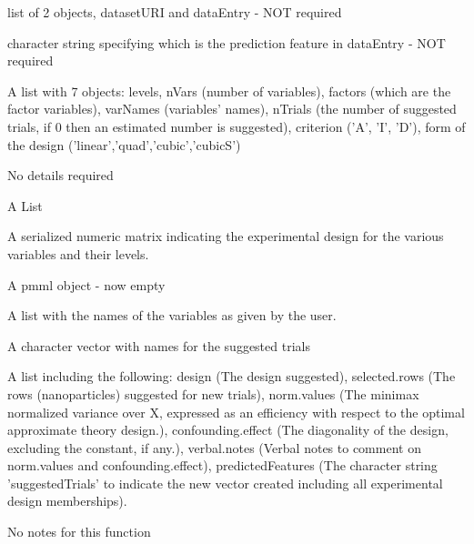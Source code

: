 \documentclass[letterpaper]{book}
\begin{document}
%
\begin{Arguments}
\begin{ldescription}
\item[\code{dataset}] list of 2 objects, datasetURI and dataEntry - NOT required 

\item[\code{predictionFeature}]  character string specifying which is the prediction feature in dataEntry - NOT required

\item[\code{parameters}] A list with 7 objects: levels, nVars (number of variables), factors (which are the factor variables), varNames (variables' names), nTrials (the number of suggested trials, if 0 then an estimated number is suggested), criterion ('A', 'I', 'D'), form of the design ('linear','quad','cubic','cubicS')

\end{ldescription}
\end{Arguments}
%
\begin{Details}\relax
No details required
\end{Details}
%
\begin{Value}
A List 
\begin{ldescription}
\item[\code{rawModel}]  A serialized numeric matrix indicating the experimental design for the various variables and their levels.
\item[\code{pmmlModel}]  A pmml object - now empty
\item[\code{independentFeatures}]  A list with the names of the variables as given by the user.
\item[\code{predictedFeatures}] A character vector with names for the suggested trials
\item[\code{additionalInfo}]  A list including the following: design (The design suggested), selected.rows (The rows (nanoparticles) suggested for new trials), norm.values (The minimax normalized variance over X, expressed as an efficiency with respect to the optimal approximate theory design.), confounding.effect (The diagonality of the design, excluding the constant, if any.), verbal.notes (Verbal notes to comment on norm.values and confounding.effect), predictedFeatures (The character string 'suggestedTrials' to indicate the new vector created including all experimental design memberships).
\end{ldescription}
\end{Value}
%
\begin{Note}\relax
 No notes for this function 
\end{Note}
\end{document}
